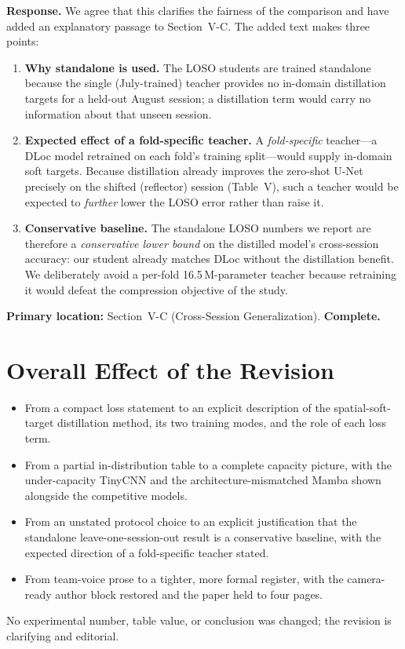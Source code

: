 \documentclass[11pt]{article}
\newcommand{\status}[1]{\textbf{\color{okgreen}#1}}
\newcommand{\response}[1]{\textbf{Response.} #1}
\begin{document}
\response{We agree that this clarifies the fairness of the comparison and have added an explanatory passage to Section~V-C.} The added text makes three points:
\begin{enumerate}[leftmargin=1.6em,itemsep=1pt,topsep=2pt]
  \item \textbf{Why standalone is used.} The LOSO students are trained standalone because the single (July-trained) teacher provides no in-domain distillation targets for a held-out August session; a distillation term would carry no information about that unseen session.
  \item \textbf{Expected effect of a fold-specific teacher.} A \emph{fold-specific} teacher---a DLoc model retrained on each fold's training split---would supply in-domain soft targets. Because distillation already improves the zero-shot U-Net precisely on the shifted (reflector) session (Table~V), such a teacher would be expected to \emph{further} lower the LOSO error rather than raise it.
  \item \textbf{Conservative baseline.} The standalone LOSO numbers we report are therefore a \emph{conservative lower bound} on the distilled model's cross-session accuracy: our student already matches DLoc without the distillation benefit. We deliberately avoid a per-fold 16.5\,M-parameter teacher because retraining it would defeat the compression objective of the study.
\end{enumerate}
\textbf{Primary location:} Section~V-C (Cross-Session Generalization). \hfill \status{Complete.}

\section{Overall Effect of the Revision}
\begin{itemize}[leftmargin=1.4em,itemsep=1pt,topsep=2pt]
  \item From a compact loss statement to an explicit description of the spatial-soft-target distillation method, its two training modes, and the role of each loss term.
  \item From a partial in-distribution table to a complete capacity picture, with the under-capacity TinyCNN and the architecture-mismatched Mamba shown alongside the competitive models.
  \item From an unstated protocol choice to an explicit justification that the standalone leave-one-session-out result is a conservative baseline, with the expected direction of a fold-specific teacher stated.
  \item From team-voice prose to a tighter, more formal register, with the camera-ready author block restored and the paper held to four pages.
\end{itemize}
No experimental number, table value, or conclusion was changed; the revision is clarifying and editorial.
\end{document}
